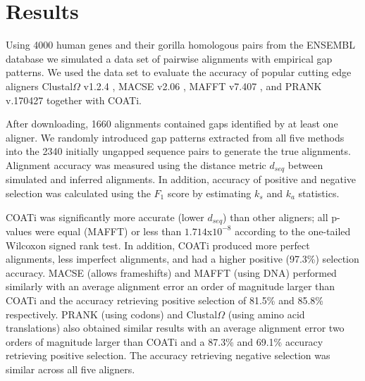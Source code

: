 \section{Results}

Using 4000 human genes and their gorilla homologous pairs from the ENSEMBL
database \parencite{ensembl_hubbard_2002} we simulated a data set of pairwise
alignments with empirical gap patterns.
We used the data set to evaluate the accuracy of popular cutting edge aligners
Clustal$\Omega$ v1.2.4 \parencite{clustal_omega_sievers_2011}, MACSE v2.06
\parencite{ranwez_macse_2011}, MAFFT v7.407 \parencite{mafft_katoh_2002}, and
PRANK v.170427 \parencite{prank_loytynoja_2014} together with COATi.

After downloading, 1660 alignments contained gaps identified by at least one
aligner.
We randomly introduced gap patterns extracted from all five methods into the
2340 initially ungapped sequence pairs to generate the true alignments.
Alignment accuracy was measured using the distance metric $d_{seq}$
\parencite{metrics_blackburne_whelan_2011} between simulated and inferred
alignments.
In addition, accuracy of positive and negative selection was calculated
using the $F_1$ score by estimating $k_s$ and $k_a$ statistics.


COATi was significantly more accurate (lower $d_{seq}$) than other aligners; all
p-values were equal (MAFFT) or less than $1.714$x$10^{-8}$ according to the
one-tailed Wilcoxon signed rank test.
In addition, COATi produced more perfect alignments, less imperfect alignments,
and had a higher positive (97.3\%) selection accuracy.
MACSE (allows frameshifts) and MAFFT (using DNA) performed similarly with an
average alignment error an order of magnitude larger than COATi and the accuracy
retrieving positive selection of 81.5\% and 85.8\% respectively.
PRANK (using codons) and Clustal$\Omega$ (using amino acid translations) also
obtained similar results with an average alignment error two orders of magnitude
larger than COATi and a 87.3\% and 69.1\% accuracy retrieving positive selection.
The accuracy retrieving negative selection was similar across all five
aligners.


